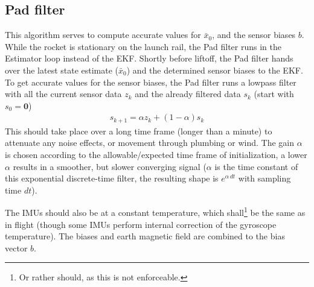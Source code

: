 \subsection{Pad filter}
\label{sec:estimator-initialization}
This algorithm serves to compute accurate values for $\bar x_0$, and the sensor biases $b$.
While the rocket is stationary on the launch rail, the Pad filter runs in the Estimator loop instead of the EKF.
Shortly before liftoff, the Pad filter hands over the latest state estimate ($\bar x_0$) and the determined sensor biases to the EKF.
To get accurate values for the sensor biases, the Pad filter runs a lowpass filter with all the current sensor data $z_k$ and the already filtered data $s_k$ (start with $s_0 = \bm 0$)
\begin{align}
    s_{k+1} = \alpha z_k + (1-  \alpha) s_k
\end{align}
This should take place over a long time frame (longer than a minute) to attenuate any noise effects, or movement through plumbing or wind.
The gain $\alpha$ is chosen according to the allowable/expected time frame of initialization, a lower $\alpha$ results in a smoother, but slower converging signal ($\alpha$ is the time constant of this exponential discrete-time filter, the resulting shape is $e^{\alpha \, dt}$ with sampling time $dt$).

The IMUs should also be at a constant temperature, which shall\footnote{Or rather should, as this is not enforceable.} be the same as in flight (though some IMUs perform internal correction of the gyroscope temperature).
The biases and earth magnetic field are combined to the bias vector $b$.

